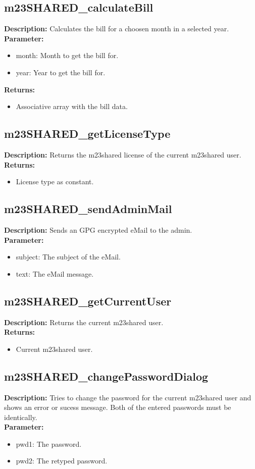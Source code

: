 \subsection{m23SHARED\_calculateBill}
\textbf{Description:} Calculates the bill for a choosen month in a selected year.\\
\textbf{Parameter:}
\begin{itemize}
\item month: Month to get the bill for.
\item year: Year to get the bill for.
\end{itemize}
\textbf{Returns:}
\begin{itemize}
\item Associative array with the bill data.
\end{itemize}

\subsection{m23SHARED\_getLicenseType}
\textbf{Description:} Returns the m23shared license of the current m23shared user.\\
\textbf{Returns:}
\begin{itemize}
\item License type as constant.
\end{itemize}

\subsection{m23SHARED\_sendAdminMail}
\textbf{Description:} Sends an GPG encrypted eMail to the admin.\\
\textbf{Parameter:}
\begin{itemize}
\item subject: The subject of the eMail.
\item text: The eMail message.
\end{itemize}

\subsection{m23SHARED\_getCurrentUser}
\textbf{Description:} Returns the current m23shared user.\\
\textbf{Returns:}
\begin{itemize}
\item Current m23shared user.
\end{itemize}

\subsection{m23SHARED\_changePasswordDialog}
\textbf{Description:} Tries to change the password for the current m23shared user and shows an error or sucess message. Both of the entered passwords must be identically.\\
\textbf{Parameter:}
\begin{itemize}
\item pwd1: The password.
\item pwd2: The retyped password.
\end{itemize}

